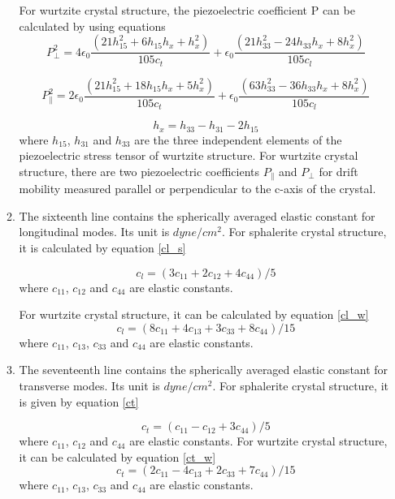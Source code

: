 \documentclass[12pt]{article}
\begin{document}
\begin{enumerate}
\begin{enumerate}[label=\Roman*]
For wurtzite crystal structure, the piezoelectric coefficient P can be calculated by using equations \cite{rode1}
\begin{equation}
\ P_{\perp}^2 = 4 \epsilon_0 \frac{(21 h_{15}^2 + 6 h_{15} h_{x } + h_x^2)}{105c_t} + \epsilon_0 \frac{(21 h_{33}^2 - 24 h_{33} h_x + 8 h_x^2)}{105c_l}  
\label{pzcoeff_w1}
\end{equation}

\begin{equation}
\ P_{\parallel}^2 = 2 \epsilon_0 \frac{(21 h_{15}^2 + 18 h_{15} h_{x } + 5 h_x^2)}{105c_t} + \epsilon_0 \frac{(63 h_{33}^2 - 36 h_{33} h_x + 8 h_x^2)}{105c_l}  
\label{pzcoeff_w2}
\end{equation}

\begin{equation}
\ h_x = h_{33} - h_{31} - 2h_{15}
\label{hx}
\end{equation}
where $h_{15}$, $h_{31}$ and $h_{33}$ are the three independent elements of the piezoelectric stress tensor of wurtzite structure.
For wurtzite crystal structure, there are two piezoelectric coefficients $P_{\parallel}$ and $P_{\perp}$ for drift mobility measured parallel or perpendicular to the c-axis of the crystal. 

\item The sixteenth line contains the spherically averaged elastic constant for longitudinal modes. Its unit is $dyne/cm^2$.  
For sphalerite crystal structure, it is calculated by equation \ref{cl_s}

\begin{equation}
\ c_l = (3c_{11} + 2c_{12} + 4c_{44})/5 
\label{cl_s}
\end{equation}
where  $c_{11}$, $c_{12}$ and $c_{44}$ are elastic constants.

For wurtzite crystal structure, it can be calculated by equation \ref{cl_w}
\begin{equation}
\ c_l = (8c_{11} + 4c_{13} + 3c_{33} + 8c_{44})/15 
\label{cl_w}
\end{equation}
where  $c_{11}$, $c_{13}$, $c_{33}$ and $c_{44}$ are elastic constants.


\item The seventeenth line contains the spherically averaged elastic constant for transverse modes. Its unit is $dyne/cm^2$. For sphalerite crystal structure, it is given by equation \ref{ct}

\begin{equation}
\ c_t = (c_{11} - c_{12} + 3c_{44})/5 
\label{ct}
\end{equation}
where $c_{11}$, $c_{12}$ and $c_{44}$ are elastic constants.
For wurtzite crystal structure, it can be calculated by equation \ref{ct_w}
\begin{equation}
\ c_t = (2c_{11} - 4c_{13} + 2c_{33} + 7c_{44})/15 
\label{ct_w}
\end{equation}
where $c_{11}$, $c_{13}$, $c_{33}$ and $c_{44}$ are elastic constants.


\end{enumerate}
\end{enumerate}
\end{document}
